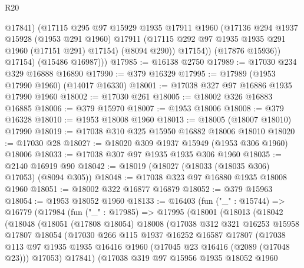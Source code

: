 \begin{lexlean}{R20}
\begin{coremodule}
                @17841)
              (@17115
                @295
                @97
                @15929
                @1935
                @17911
                @1960
                (@17136
                  @294
                  @1937
                  @15928
                  (@1953 @291 @1960)
                  @17911
                  (@17115 @292 @97 @1935 @1935 @291 @1960 (@17151 @291) @17154)
                  (@8094 @290))
                @17154))
            (@17876 @15936))
          @17154)
        (@15486 @16987)))
@17985 := @16138 @2750
@17989 := @17030 @234 @329 @16888 @16890
@17990 := @379 @16329
@17995 := @17989 (@1953 @17990 @1960) (@14017 @16330)
@18001 := @17038 @327 @97 @16886 @1935 @17990 @1960
@18002 := @17030 @261
@18005 := @18002 @326 @16883 @16885
@18006 := @379 @15970
@18007 := @1953 @18006
@18008 := @379 @16328
@18010 := @1953 @18008 @1960
@18013 := @18005 (@18007 @18010) @17990
@18019 := @17038 @310 @325 @15950 @16882 @18006 @18010
@18020 := @17030 @28
@18027 := @18020 @309 @1937 @15949 (@1953 @306 @1960) @18006
@18033 := @17038 @307 @97 @1935 @1935 @306 @1960
@18035 := @2140 @16919 @90
@18042 := @18019 (@18027 (@18033 (@18035 @306) @17053) (@8094 @305))
@18048 := @17038 @323 @97 @16880 @1935 @18008 @1960
@18051 := @18002 @322 @16877 @16879
@18052 := @379 @15963
@18054 := @1953 @18052 @1960
@18133 := @16403
    (fun ("_" : @15744) =>
    @16779
      (@17984
        (fun ("_" : @17985) =>
        @17995
          (@18001
            (@18013
              (@18042
                (@18048
                  (@18051
                    (@17808 @18054)
                    @18008
                    (@17038
                      @312
                      @321
                      @16253
                      @15958
                      @17807
                      @18054
                      (@17030
                        @266
                        @115
                        @1937
                        @16252
                        @16587
                        @17807
                        (@17038
                          @113
                          @97
                          @1935
                          @1935
                          @16416
                          @1960
                          (@17045 @23 @16416 (@2089 (@17048 @23)))
                          @17053)
                        @17841)
                      (@17038
                        @319
                        @97
                        @15956
                        @1935
                        @18052
                        @1960

\end{coremodule}
\end{lexlean}
